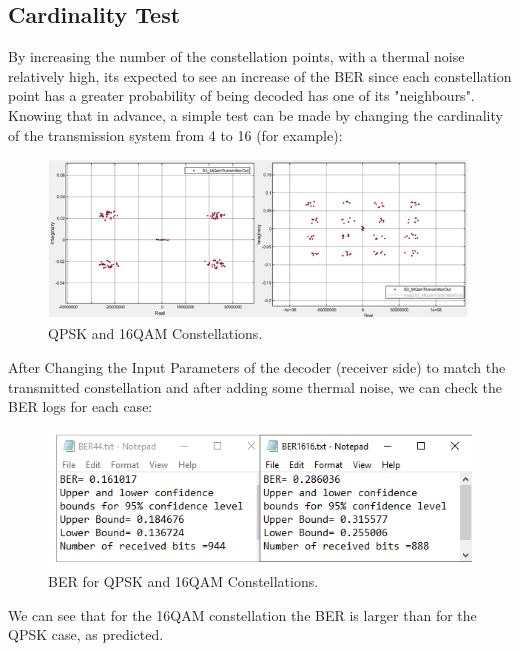 \subsection*{Cardinality Test}
By increasing the number of the constellation points, with a thermal noise relatively high, its expected to see an increase of the BER since each constellation point has a greater probability of being decoded has one of its "neighbours".
Knowing that in advance, a simple test can be made by changing the cardinality of the transmission system from 4 to 16 (for example):
\begin{figure}[H]
	\centering
	\includegraphics[scale=0.5]{./lib/m_qam_transmitter/figures/Cardinality}
	\caption{QPSK and 16QAM Constellations.}\label{Cardinality}
\end{figure}
After Changing the Input Parameters of the decoder (receiver side) to match the transmitted constellation and after adding some thermal noise, we can check the BER logs for each case:
\begin{figure}[H]
	\centering
	\includegraphics[scale=0.75]{./lib/m_qam_transmitter/figures/CardiBER}
	\caption{BER for QPSK and 16QAM Constellations.}\label{CardiBER}
\end{figure}
We can see that for the 16QAM constellation the BER is larger than for the QPSK case, as predicted.

